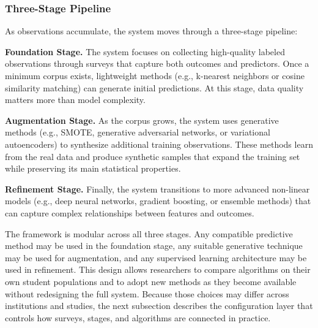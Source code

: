 \documentclass[letterpaper,11pt]{article}
\begin{document}
\subsubsection{Three-Stage Pipeline}

As observations accumulate, the system moves through a three-stage pipeline:

\textbf{Foundation Stage.} The system focuses on collecting high-quality labeled observations through surveys that capture both outcomes and predictors. Once a minimum corpus exists, lightweight methods (e.g., k-nearest neighbors or cosine similarity matching) can generate initial predictions. At this stage, data quality matters more than model complexity.

\textbf{Augmentation Stage.} As the corpus grows, the system uses generative methods (e.g., SMOTE, generative adversarial networks, or variational autoencoders) to synthesize additional training observations. These methods learn from the real data and produce synthetic samples that expand the training set while preserving its main statistical properties.

\textbf{Refinement Stage.} Finally, the system transitions to more advanced non-linear models (e.g., deep neural networks, gradient boosting, or ensemble methods) that can capture complex relationships between features and outcomes.

The framework is modular across all three stages. Any compatible predictive method may be used in the foundation stage, any suitable generative technique may be used for augmentation, and any supervised learning architecture may be used in refinement. This design allows researchers to compare algorithms on their own student populations and to adopt new methods as they become available without redesigning the full system. Because those choices may differ across institutions and studies, the next subsection describes the configuration layer that controls how surveys, stages, and algorithms are connected in practice.
\end{document}
